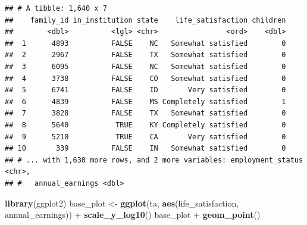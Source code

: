 \documentclass[]{book}
\newenvironment{Shaded}{\begin{snugshade}}{\end{snugshade}}
\newcommand{\KeywordTok}[1]{\textcolor[rgb]{0.13,0.29,0.53}{\textbf{{#1}}}}
\newcommand{\DataTypeTok}[1]{\textcolor[rgb]{0.13,0.29,0.53}{{#1}}}
\newcommand{\DecValTok}[1]{\textcolor[rgb]{0.00,0.00,0.81}{{#1}}}
\newcommand{\StringTok}[1]{\textcolor[rgb]{0.31,0.60,0.02}{{#1}}}
\newcommand{\CommentTok}[1]{\textcolor[rgb]{0.56,0.35,0.01}{\textit{{#1}}}}
\newcommand{\OtherTok}[1]{\textcolor[rgb]{0.56,0.35,0.01}{{#1}}}
\newcommand{\NormalTok}[1]{{#1}}
\theoremstyle{definition}
\theoremstyle{definition}
\theoremstyle{remark}
\begin{document}
\begin{Shaded}
\end{Shaded}

\begin{verbatim}
## # A tibble: 1,640 x 7
##    family_id in_institution state    life_satisfaction children
##        <dbl>          <lgl> <chr>                <ord>    <dbl>
##  1      4893          FALSE    NC   Somewhat satisfied        0
##  2      2967          FALSE    TX   Somewhat satisfied        0
##  3      6095          FALSE    NC   Somewhat satisfied        0
##  4      3738          FALSE    CO   Somewhat satisfied        0
##  5      6741          FALSE    ID       Very satisfied        0
##  6      4839          FALSE    MS Completely satisfied        1
##  7      3828          FALSE    TX   Somewhat satisfied        0
##  8      5640           TRUE    KY Completely satisfied        0
##  9      5210           TRUE    CA       Very satisfied        0
## 10       339          FALSE    IN   Somewhat satisfied        0
## # ... with 1,630 more rows, and 2 more variables: employment_status <chr>,
## #   annual_earnings <dbl>
\end{verbatim}

\begin{Shaded}
\begin{Highlighting}[]
\KeywordTok{library}\NormalTok{(ggplot2)}
\NormalTok{base_plot <-}\StringTok{ }\KeywordTok{ggplot}\NormalTok{(ta, }\KeywordTok{aes}\NormalTok{(life_satisfaction, annual_earnings)) +}\StringTok{ }\KeywordTok{scale_y_log10}\NormalTok{()}
\NormalTok{base_plot +}\StringTok{ }\KeywordTok{geom_point}\NormalTok{()}
\end{Highlighting}
\end{Shaded}
\end{document}
